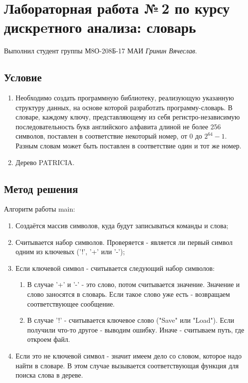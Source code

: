\documentclass[12pt]{article}
\begin{document}
\section*{Лабораторная работа №\,2 по курсу дискрeтного анализа: словарь}

Выполнил студент группы М8О-208Б-17 МАИ \textit{Гринин Вячеслав}.

\subsection*{Условие}
\begin{enumerate}
	\item Необходимо создать программную библиотеку, реализующую указанную структуру данных, на основе которой разработать программу-словарь. В словаре, каждому ключу, представляющему из себя регистро-независимую последовательность букв английского алфавита длиной не более 256 символов, поставлен в соответствие некоторый номер, от $0$ до $2^64 - 1$. Разным словам может быть поставлен в соответствие один и тот же номер.
	\item Дерево PATRICIA. 
\end{enumerate}

\subsection*{Метод решения}

Алгоритм работы main:
\begin{enumerate}
	\item Создаётся массив символов, куда будут записываться команды и слова;
	\item Считывается набор символов. Проверяется - является ли первый символ одним из ключевых ('!', '+' или '-');
	\item Если ключевой символ - считывается следующий набор символов:
	\begin{enumerate}
		\item В случае '+' и '-' - это слово, потом считывается значение. Значение и слово заносятся в словарь. Если такое слово уже есть - возвращаем соответствующее сообщение. 
		\item В случае '!' - считывается ключевое слово ("Save" или "Load"). Если получили что-то другое - выводим ошибку. Иначе - считываем путь, где откроем файл.
	\end{enumerate}
	\item Если это не ключевой символ - значит имеем дело со словом, которое надо найти в словаре. В этом случае вызывается соответствующая функция для поиска слова в дереве.
\end{enumerate}
\end{document}
